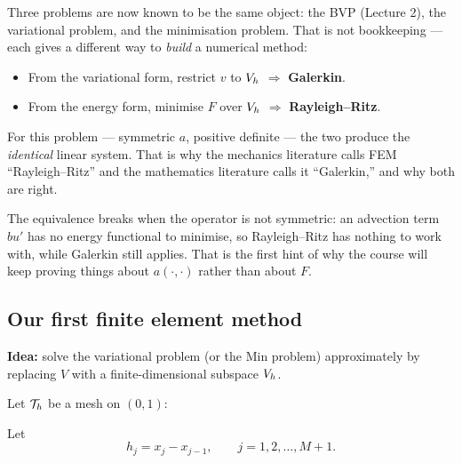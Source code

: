 \begin{intuition}
Three problems are now known to be the same object: the BVP (Lecture 2), the
variational problem, and the minimisation problem. That is not bookkeeping ---
each gives a different way to \emph{build} a numerical method:
\begin{itemize}[leftmargin=1.4em,itemsep=2pt]
  \item From the variational form, restrict $v$ to $V_{h}$ $\Rightarrow$
        \textbf{Galerkin}.
  \item From the energy form, minimise $F$ over $V_{h}$ $\Rightarrow$
        \textbf{Rayleigh--Ritz}.
\end{itemize}
For this problem --- symmetric $a$, positive definite --- the two produce the
\emph{identical} linear system. That is why the mechanics literature calls FEM
``Rayleigh--Ritz'' and the mathematics literature calls it ``Galerkin,'' and
why both are right.

The equivalence breaks when the operator is not symmetric: an advection term
$b u'$ has no energy functional to minimise, so Rayleigh--Ritz has nothing to
work with, while Galerkin still applies. That is the first hint of why the
course will keep proving things about $a(\cdot,\cdot)$ rather than about $F$.
\end{intuition}

\subsection*{Our first finite element method}

\textbf{Idea:} solve the variational problem (or the Min problem) approximately
by replacing $V$ with a finite-dimensional subspace $V_{h}$.

Let $\mathcal{T}_{h}$ be a mesh on $(0,1)$:
\begin{center}
\end{center}
Let
\begin{equation}
  h_{j} = x_{j} - x_{j-1},
  \qquad j = 1,2,\dots,M+1 .
\end{equation}

